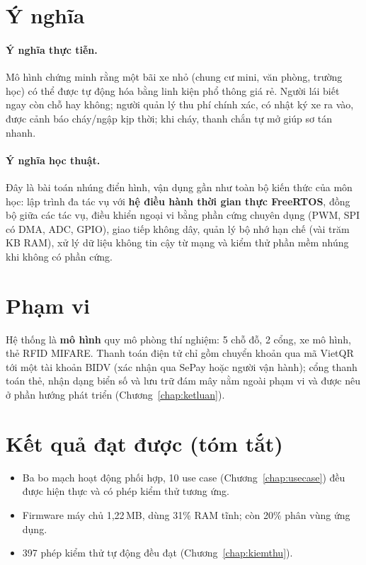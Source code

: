 \section{Ý nghĩa}
\paragraph{Ý nghĩa thực tiễn.} Mô hình chứng minh rằng một bãi xe nhỏ (chung cư mini,
văn phòng, trường học) có thể được tự động hóa bằng linh kiện phổ thông giá rẻ.
Người lái biết ngay còn chỗ hay không; người quản lý thu phí chính xác, có nhật ký
xe ra vào, được cảnh báo cháy/ngập kịp thời; khi cháy, thanh chắn tự mở giúp sơ tán
nhanh.

\paragraph{Ý nghĩa học thuật.} Đây là bài toán nhúng điển hình, vận dụng gần như toàn
bộ kiến thức của môn học: lập trình đa tác vụ với \textbf{hệ điều hành thời gian
thực FreeRTOS}, đồng bộ giữa các tác vụ, điều khiển ngoại vi bằng phần cứng chuyên
dụng (PWM, SPI có DMA, ADC, GPIO), giao tiếp không dây, quản lý bộ nhớ hạn chế
(vài trăm KB RAM), xử lý dữ liệu không tin cậy từ mạng và kiểm thử phần mềm nhúng
khi không có phần cứng.

\section{Phạm vi}
Hệ thống là \textbf{mô hình} quy mô phòng thí nghiệm: 5 chỗ đỗ, 2 cổng, xe mô hình,
thẻ RFID MIFARE. Thanh toán điện tử chỉ gồm chuyển khoản qua mã VietQR tới một tài
khoản BIDV (xác nhận qua SePay hoặc người vận hành); cổng thanh toán thẻ, nhận dạng
biển số và lưu trữ đám mây nằm ngoài phạm vi và được nêu ở phần hướng phát triển (Chương~\ref{chap:ketluan}).

\section{Kết quả đạt được (tóm tắt)}
\begin{itemize}
  \item Ba bo mạch hoạt động phối hợp, 10 use case (Chương~\ref{chap:usecase}) đều
        được hiện thực và có phép kiểm thử tương ứng.
  \item Firmware máy chủ 1,22\,MB, dùng 31\% RAM tĩnh; còn 20\% phân vùng ứng dụng.
  \item 397 phép kiểm thử tự động đều đạt (Chương~\ref{chap:kiemthu}).
\end{itemize}

